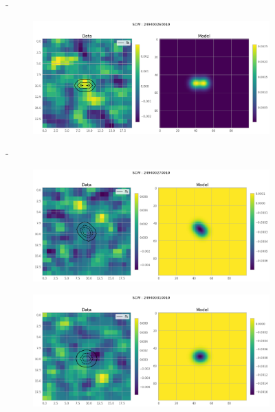 \documentclass[
	a4paper, %
	10pt, %
	unnumberedsections, %
	twoside, %
]{LTJournalArticle}
\begin{document}
\begin{figure}[H]
\begin{subfigure}{.47\textwidth}
    \end{subfigure}
    \hspace{1em}-
    \begin{subfigure}{.47\textwidth}
        \includegraphics[width=\textwidth]{report/Figures/models/2204/26_psf_const.png}
    \end{subfigure}%
    \hspace{1em}-
    \begin{subfigure}{.47\textwidth}
        \centering
        \includegraphics[width=\textwidth]{report/Figures/models/2204/27_psf_const.png}
    \end{subfigure}
    \begin{subfigure}{.47\textwidth}
        \centering
        \includegraphics[width=\textwidth]{report/Figures/models/2204/31_psf_const.png}

\end{subfigure}
\end{figure}
\end{document}
